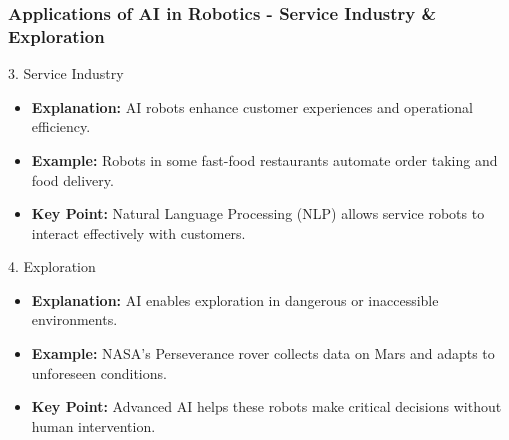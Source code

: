 \documentclass[aspectratio=169]{beamer}
\begin{document}
\begin{frame}[fragile]
    \frametitle{Applications of AI in Robotics - Service Industry & Exploration}
    \begin{block}{3. Service Industry}
        \begin{itemize}
            \item \textbf{Explanation:} AI robots enhance customer experiences and operational efficiency.
            \item \textbf{Example:} Robots in some fast-food restaurants automate order taking and food delivery.
            \item \textbf{Key Point:} Natural Language Processing (NLP) allows service robots to interact effectively with customers.
        \end{itemize}
    \end{block}

    \begin{block}{4. Exploration}
        \begin{itemize}
            \item \textbf{Explanation:} AI enables exploration in dangerous or inaccessible environments.
            \item \textbf{Example:} NASA's Perseverance rover collects data on Mars and adapts to unforeseen conditions.
            \item \textbf{Key Point:} Advanced AI helps these robots make critical decisions without human intervention.
        \end{itemize}
    \end{block}
\end{frame}
\end{document}
